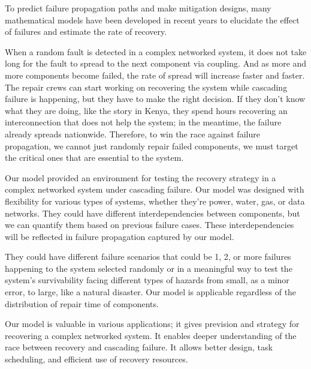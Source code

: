 To predict failure propagation paths and make mitigation designs, many mathematical models have been developed in recent years to elucidate the effect of failures and estimate the rate of recovery. 

When a random fault is detected in a complex networked system, it does not take long for the fault to spread to the next component via coupling. And as more and more components become failed, the rate of spread will increase faster and faster. The repair crews can start working on recovering the system while cascading failure is happening, but they have to make the right decision. If they don't know what they are doing, like the story in Kenya, they spend hours recovering an interconnection that does not help the system; in the meantime, the failure already spreads nationwide. 
Therefore, to win the race against failure propagation, we cannot just randomly repair failed components, we must target the critical ones that are essential to the system. 

Our model provided an environment for testing the recovery strategy in a complex networked system under cascading failure. Our model was designed with flexibility for various types of systems, whether they're power, water, gas, or data networks. 
They could have different interdependencies between components, but we can quantify them based on previous failure cases. These interdependencies will be reflected in failure propagation captured by our model. 

They could have different failure scenarios that could be 1, 2, or more failures happening to the system selected randomly or in a meaningful way to test the system's survivability facing different types of hazards from small, as a minor error, to large, like a natural disaster. Our model is applicable regardless of the distribution of repair time of components. 

Our model is valuable in various applications; it gives prevision and strategy for recovering a complex networked system. It enables deeper understanding of the race between recovery and cascading failure. It allows better design, task scheduling, and efficient use of recovery resources. 

